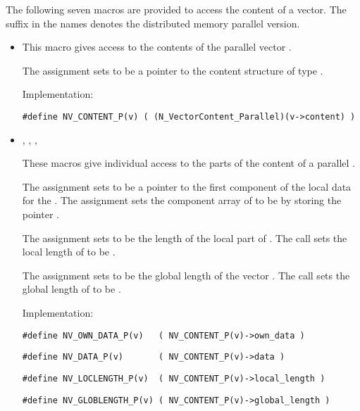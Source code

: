 The following seven macros are provided to access the content of a {\nvecp}
vector. The suffix  in the names denotes the distributed memory
parallel version.
\begin{itemize}

\item 

  This macro gives access to the contents of the parallel
  vector .
  
  The assignment  sets       
   to be a pointer to the  content    
  structure of type .
  
  Implementation:
  
  \verb|#define NV_CONTENT_P(v) ( (N_VectorContent_Parallel)(v->content) )|
  
\item 
  , , 
  , 
  
  These macros give individual access to the parts of    
  the content of a parallel .                        
  
  The assignment  sets  to be     
  a pointer to the first component of the local data for the  . 
  The assignment  sets the component array of 
   to be  by storing the pointer .                   
  
  The assignment  sets  to be     
  the length of the local part of . 
  The call  sets      
  the local length of  to be .
  
  The assignment  sets  to  
  be the global length of the vector .                    
  The call  sets the global       
  length of  to be .
  
  Implementation:
  
  \verb|#define NV_OWN_DATA_P(v)   ( NV_CONTENT_P(v)->own_data )|

  \verb|#define NV_DATA_P(v)       ( NV_CONTENT_P(v)->data )|

  \verb|#define NV_LOCLENGTH_P(v)  ( NV_CONTENT_P(v)->local_length )|

  \verb|#define NV_GLOBLENGTH_P(v) ( NV_CONTENT_P(v)->global_length )|
  

\end{itemize}
